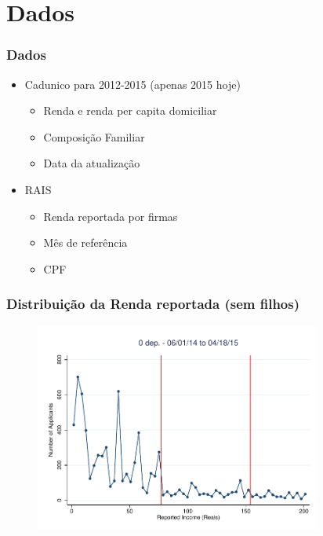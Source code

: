 \documentclass[xcolor=pdftex,dvipsnames,table]{beamer}
\begin{document}
\section{Dados}
\begin{frame}
	\frametitle{Dados}
\pause
\begin{itemize}
\item Cadunico para 2012-2015 (apenas 2015 hoje)
\begin{itemize}
\item Renda e renda per capita domiciliar
\item Composi\c{c}\~ao Familiar
\item Data da atualiza\c{c}\~ao
\end{itemize}
\pause
\item RAIS
\begin{itemize}
\item Renda reportada por firmas
\item M\^es de refer\^encia
\item CPF
\end{itemize}
\end{itemize}
\end{frame}

\begin{frame}
\begin{table}[htbp]
  \centering
  \caption{Quem est\'a no Mercado Formal?}
    
  \label{tab_selection}%
\end{table}%
\end{frame}

\begin{frame}[label=ybar0]
\frametitle{Distribui\c{c}\~ao da Renda reportada (sem filhos)}
\begin{figure}[H]
\begin{center}
\includegraphics[height=2.7in]{Dom_060114_non_0_bin3p5.pdf}
\end{center}
\end{figure}
\hyperlink{ybar0_sel}{}
\end{frame}
\end{document}
